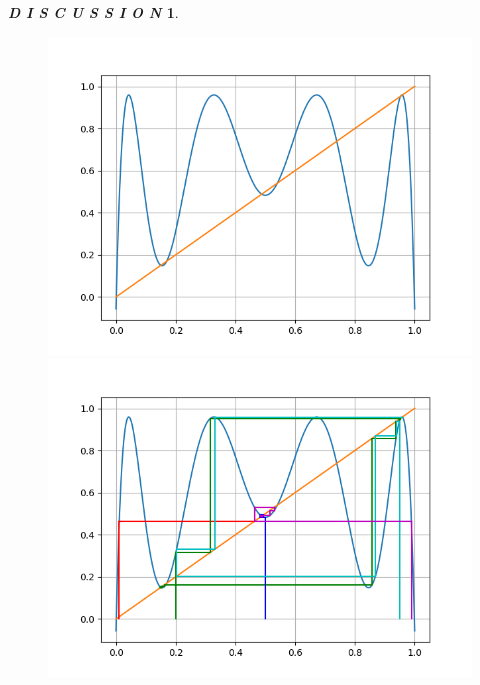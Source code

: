 \documentclass[12pt]{article}
\theoremstyle{plain}
\newtheorem{discussion}{\textit{D I S C U S S I O N}}[section]
\begin{document}
\begin{discussion}
\begin{figure}[H]
\begin{minipage}[c][0.33\width]{0.33\textwidth}
   \centering
   \includegraphics[width=\textwidth]{figure/section1/g3logistic-origin.png}
\end{minipage}
\begin{minipage}[c][0.33\width]{0.33\textwidth}
   \centering
   \includegraphics[width=\textwidth]{figure/section1/g3logistic384.png}
\end{minipage}
\begin{minipage}[c][0.33\width]{0.33\textwidth}
   \centering

\end{minipage}
\end{figure}
\end{discussion}
\end{document}
